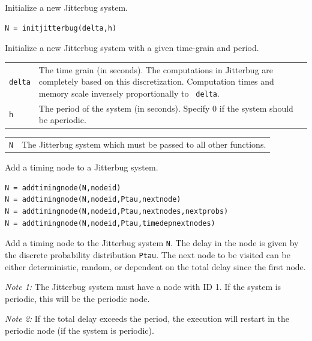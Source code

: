 \documentclass[final,twoside]{rapport}  %
\begin{document}

\label{sec:initjitterbug}

\purpose
Initialize a new {\sc Jitterbug} system.

\syntax
\begin{verbatim}
N = initjitterbug(delta,h)
\end{verbatim}

\descr 
Initialize a new {\sc Jitterbug} system with a given time-grain and
period.

\args
\begin{tabularx}{\hsize}{l>{\raggedright\arraybackslash}X}
  {\tt delta} & The time grain (in seconds). The computations in {\sc
    Jitterbug} are completely based on this discretization.
  Computation times and memory scale inversely proportionally to {\tt
    delta}. \\ 
  {\tt h} & The period of the system (in seconds). Specify 0 if the
  system should be aperiodic.
\end{tabularx}
 
\retvals
\begin{tabularx}{\hsize}{l>{\raggedright\arraybackslash}X}
{\tt N} & The {\sc Jitterbug} system which must be passed to all other
functions.
\end{tabularx}



\label{sec:addtimingnode}

\purpose
Add a timing node to a {\sc Jitterbug} system.

\syntax
\begin{verbatim}
N = addtimingnode(N,nodeid)
N = addtimingnode(N,nodeid,Ptau,nextnode)
N = addtimingnode(N,nodeid,Ptau,nextnodes,nextprobs)
N = addtimingnode(N,nodeid,Ptau,timedepnextnodes)
\end{verbatim}

\descr
Add a timing node to the {\sc Jitterbug} system {\tt N}. The delay in
the node is given by the discrete probability distribution {\tt Ptau}.
The next node to be visited can be either deterministic, random, or
dependent on the total delay since the first node.

{\em Note 1:} The {\sc Jitterbug} system must have a node with ID 1.
If the system is periodic, this will be the periodic node.

{\em Note 2:} If the total delay exceeds the period, the execution
          will restart in the periodic node (if the system is periodic).
 
\end{document}
